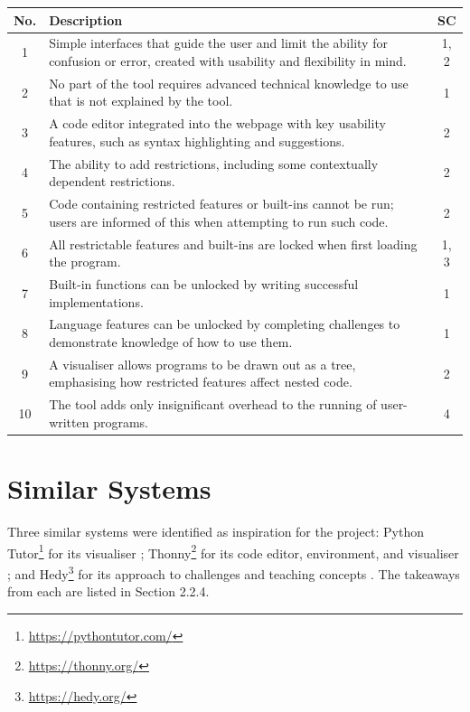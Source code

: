 \begin{table}[h]
\centering
\begin{tabular}{|c|p{10cm}|c|}
\hline
\textbf{No.} & \textbf{Description} & \textbf{SC} \\ \hline
1 & Simple interfaces that guide the user and limit the ability for confusion or error, created with usability and flexibility in mind. & 1, 2 \\ \hline
2 & No part of the tool requires advanced technical knowledge to use that is not explained by the tool. & 1 \\ \hline
3 & A code editor integrated into the webpage with key usability features, such as syntax highlighting and suggestions. & 2 \\ \hline
4 & The ability to add restrictions, including some contextually dependent restrictions. & 2 \\ \hline
5 & Code containing restricted features or built-ins cannot be run; users are informed of this when attempting to run such code. & 2 \\ \hline
6 & All restrictable features and built-ins are locked when first loading the program. & 1, 3 \\ \hline
7 & Built-in functions can be unlocked by writing successful implementations. & 1 \\ \hline
8 & Language features can be unlocked by completing challenges to demonstrate knowledge of how to use them. & 1 \\ \hline
9 & A visualiser allows programs to be drawn out as a tree, emphasising how restricted features affect nested code. & 2 \\ \hline
10 & The tool adds only insignificant overhead to the running of user-written programs. & 4 \\ \hline
\end{tabular}
\end{table}

\section{Similar Systems}

Three similar systems were identified as inspiration for the project: Python Tutor\footnote{\href{https://pythontutor.com/}{https://pythontutor.com/}} for its visualiser \cite{guo_online_2013}; Thonny\footnote{\href{https://thonny.org/}{https://thonny.org/}} for its code editor, environment, and visualiser \cite{annamaa_introducing_2015}; and Hedy\footnote{\href{https://hedy.org/}{https://hedy.org/}} for its approach to challenges and teaching concepts \cite{hermans_hedy_2020}. The takeaways from each are listed in Section 2.2.4.

